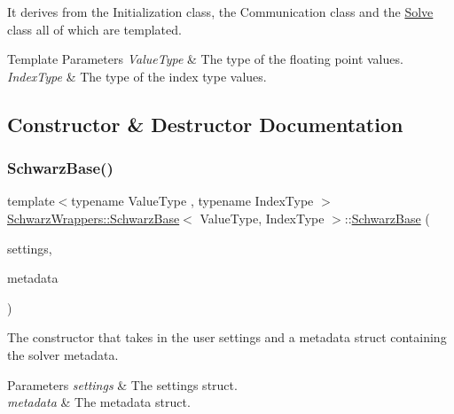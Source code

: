 It derives from the Initialization class, the Communication class and the \hyperlink{classSchwarzWrappers_1_1Solve}{Solve} class all of which are templated.


\begin{DoxyTemplParams}{Template Parameters}
{\em Value\+Type} & The type of the floating point values. \\
\hline
{\em Index\+Type} & The type of the index type values. \\
\hline
\end{DoxyTemplParams}


\subsection{Constructor \& Destructor Documentation}
\mbox{\label{classSchwarzWrappers_1_1SchwarzBase_a158b6450f7b00d3128c39365cde780d0}} 
\subsubsection{\texorpdfstring{Schwarz\+Base()}{SchwarzBase()}}
{\footnotesize\ttfamily template$<$typename Value\+Type , typename Index\+Type $>$ \\
\hyperlink{classSchwarzWrappers_1_1SchwarzBase}{Schwarz\+Wrappers\+::\+Schwarz\+Base}$<$ Value\+Type, Index\+Type $>$\+::\hyperlink{classSchwarzWrappers_1_1SchwarzBase}{Schwarz\+Base} (\begin{DoxyParamCaption}\item[{\hyperlink{structSchwarzWrappers_1_1Settings}{Settings} \&}]{settings,  }\item[{\hyperlink{structSchwarzWrappers_1_1Metadata}{Metadata}$<$ Value\+Type, Index\+Type $>$ \&}]{metadata }\end{DoxyParamCaption})}



The constructor that takes in the user settings and a metadata struct containing the solver metadata. 


\begin{DoxyParams}{Parameters}
{\em settings} & The settings struct. \\
\hline
{\em metadata} & The metadata struct. \\
\hline
\end{DoxyParams}


